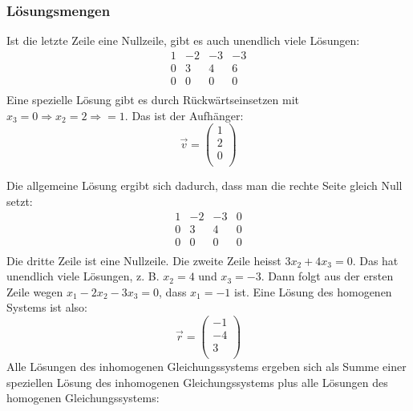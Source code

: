 \subsubsection{Lösungsmengen}
\begin{comment} %
Ein Gleichungssystem kann keine Lösung haben:
\begin{align}
  x_1 + x_2 = 1 \\
  x_1 + x_2 = 2
\end{align}

Oder unendlich viele:
\[ x_1 + x_2 = 2 \] Dabei ist die Lösungsmenge für $x_1 = t$ und $x_2 =
2 - t$.
\end{comment}

Ist die letzte Zeile eine Nullzeile, gibt es auch unendlich viele
Lösungen:
\[ \begin{array}{rrrr}
1  &   -2     & -3     & -3   \\
0   &   3     & 4     & 6   \\
0   &   0     & 0     & 0   \\
\end {array} \]
Eine spezielle Lösung gibt es durch Rückwärtseinsetzen mit $x_3 = 0
\Rightarrow x_2 = 2 \Rightarrow = 1$. Das ist der Aufhänger:
\[ \vec v = \left( \begin {array} {c} 1 \\ 2 \\ 0 \\ \end {array} \right) \]

Die allgemeine Lösung ergibt sich dadurch, dass man die rechte Seite
gleich Null setzt:
\[ \begin{array}{rrrr}
1  &   -2     & -3     & 0 \\
0   &   3     & 4     & 0 \\
0   &   0     & 0     & 0 \\
\end {array} \]
Die dritte Zeile ist eine Nullzeile. Die zweite Zeile heisst $3x_2 +
4x_3 = 0$. Das hat unendlich viele Lösungen, z. B. $x_2 = 4$ und $x_3 =
-3$. Dann folgt aus der ersten Zeile wegen $x_1 - 2x_2 - 3x_3 = 0$, dass
$x_1 = -1$ ist. Eine Lösung des homogenen Systems ist also:
\[ \vec r = \left( \begin {array} {c} -1 \\ -4 \\ 3 \\ \end {array} \right) \]
Alle Lösungen des inhomogenen Gleichungssystems ergeben sich als Summe
einer speziellen Lösung des inhomogenen Gleichungssystems plus alle
Lösungen des homogenen Gleichungssystems:

